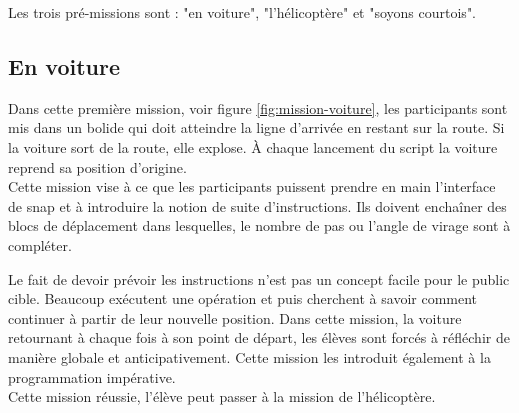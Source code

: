 Les trois pré-missions sont : "en voiture", "l'hélicoptère" et "soyons courtois".


%

\subsection{En voiture}
\label{mission-voiture}
Dans cette première \gls{mission}, voir figure \ref{fig:mission-voiture}, les participants sont mis dans un bolide qui doit atteindre la ligne d'arrivée en restant sur la route. Si la voiture sort de la route, elle explose. À chaque lancement du \gls{script} la voiture reprend sa position d'origine.\\

Cette \gls{mission} vise à ce que les participants puissent prendre en main l'interface de \gls{snap} et à introduire la notion de suite d'instructions. Ils doivent enchaîner des \glspl{bloc} de déplacement dans lesquelles, le nombre de pas ou l'angle de virage sont à compléter.

Le fait de devoir prévoir les instructions n'est pas un concept facile pour le public cible. Beaucoup exécutent une opération et puis cherchent à savoir comment continuer à partir de leur nouvelle position. Dans cette \gls{mission}, la voiture retournant à chaque fois à son point de départ, les élèves sont forcés à réfléchir de manière globale et anticipativement. Cette \gls{mission} les introduit également à la programmation impérative.\\

Cette \gls{mission} réussie, l'élève peut passer à la \gls{mission} de l'hélicoptère.

